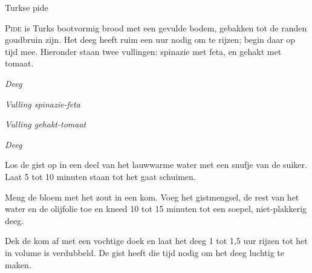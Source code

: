 \begin{recipe}{Turkse pide}


\lettrine{P}{ide} is Turks bootvormig brood met een gevulde bodem, gebakken tot
de randen goudbruin zijn. Het deeg heeft ruim een uur nodig om te rijzen; begin
daar op tijd mee. Hieronder staan twee vullingen: spinazie met feta, en gehakt
met tomaat.


\noindent\textit{Deeg}
\begin{ingredients}
\end{ingredients}

\medskip
\noindent\textit{Vulling spinazie-feta}
\begin{ingredients}
\end{ingredients}

\medskip
\noindent\textit{Vulling gehakt-tomaat}
\begin{ingredients}
\end{ingredients}


\medskip
\noindent\textit{Deeg}
\begin{steps}
  \item Los de gist op in een deel van het lauwwarme water met een snufje van
        de suiker. Laat 5 tot 10 minuten staan tot het gaat schuimen.
  \item Meng de bloem met het zout in een kom. Voeg het gistmengsel, de rest
        van het water en de olijfolie toe en kneed 10 tot 15 minuten tot een
        soepel, niet-plakkerig deeg.
  \item Dek de kom af met een vochtige doek en laat het deeg 1 tot 1{,}5 uur
        rijzen tot het in volume is verdubbeld. De gist heeft die tijd nodig
        om het deeg luchtig te maken.
\end{steps}


\end{recipe}
